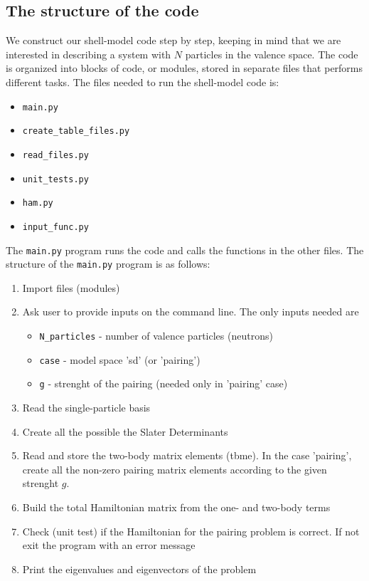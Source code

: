 \documentclass[twoside]{article}
\begin{document}
\subsection{The structure of the code}

We construct our shell-model code step by step, keeping in mind that we are interested in describing a system with $N$ particles in the valence space. The code is organized into blocks of code, or modules, stored in separate files that performs different tasks. The files needed to run the shell-model code is:
\begin{itemize}
\item \texttt{main.py}
\item \texttt{create\_table\_files.py}
\item \texttt{read\_files.py}
\item \texttt{unit\_tests.py} 
\item \texttt{ham.py} 
\item \texttt{input\_func.py}
\end{itemize}
\smallskip

The \texttt{main.py} program runs the code and calls the functions in the other files. The structure of the \texttt{main.py} program is as follows:

\begin{enumerate}
\item Import files (modules)
\item Ask user to provide inputs on the command line. The only inputs needed are
\begin{itemize}
\item \texttt{N\_particles} - number of valence particles (neutrons) 
\item \texttt{case} - model space 'sd' (or 'pairing')
\item \texttt{g} - strenght of the pairing (needed only in 'pairing' case)
\end{itemize}
\item Read the single-particle basis
\item Create all the possible the Slater Determinants
\item Read and store the two-body matrix elements (tbme). In the case 'pairing', create all the non-zero pairing matrix elements according to the given strenght $g$.
\item Build the total Hamiltonian matrix from the one- and two-body terms
\item Check (unit test) if the Hamiltonian for the pairing problem is correct. If not exit the program with an error message
\item Print the eigenvalues and eigenvectors of the problem
\end{enumerate}
\end{document}
